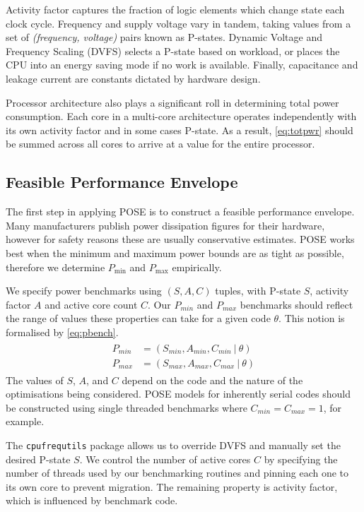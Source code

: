 Activity factor captures the fraction of logic elements which change state each clock cycle.
Frequency and supply voltage vary in tandem, taking values from a set of \textit{(frequency, voltage)} pairs known as P-states.
Dynamic Voltage and Frequency Scaling (DVFS) selects a P-state based on workload, or places the CPU into an energy saving mode if no work is available.
Finally, capacitance and leakage current are constants dictated by hardware design.

Processor architecture also plays a significant roll in determining total power consumption.
Each core in a multi-core architecture operates independently with its own activity factor and in some cases P-state.
As a result, \autoref{eq:totpwr} should be summed across all cores to arrive at a value for the entire processor.

\subsection{Feasible Performance Envelope}
The first step in applying POSE is to construct a feasible performance envelope.
Many manufacturers publish power dissipation figures for their hardware, however for safety reasons these are usually conservative estimates.
POSE works best when the minimum and maximum power bounds are as tight as possible, therefore we determine $P_{\min}$ and $P_{\max}$ empirically.

We specify power benchmarks using $(S,A,C)$ tuples, with P-state $S$, activity factor $A$ and active core count $C$.
Our $P_{min}$ and $P_{max}$ benchmarks should reflect the range of values these properties can take for a given code $\theta$.
This notion is formalised by \autoref{eq:pbench}.
\begin{align}
  \label{eq:pbench}
  \begin{split}
    P_{min} &= (S_{min}, A_{min}, C_{min}~\vert~\theta) \\
    P_{max} &= (S_{max}, A_{max}, C_{max}~\vert~\theta) 
  \end{split}
\end{align}
The values of $S$, $A$, and $C$ depend on the code and the nature of the optimisations being considered.
POSE models for inherently serial codes should be constructed using single threaded benchmarks where $C_{min} = C_{max} = 1$, for example.

The \texttt{cpufrequtils} package allows us to override DVFS and manually set the desired P-state $S$.
We control the number of active cores $C$ by specifying the number of threads used by our benchmarking routines and pinning each one to its own core to prevent migration.
The remaining property is activity factor, which is influenced by benchmark code.

